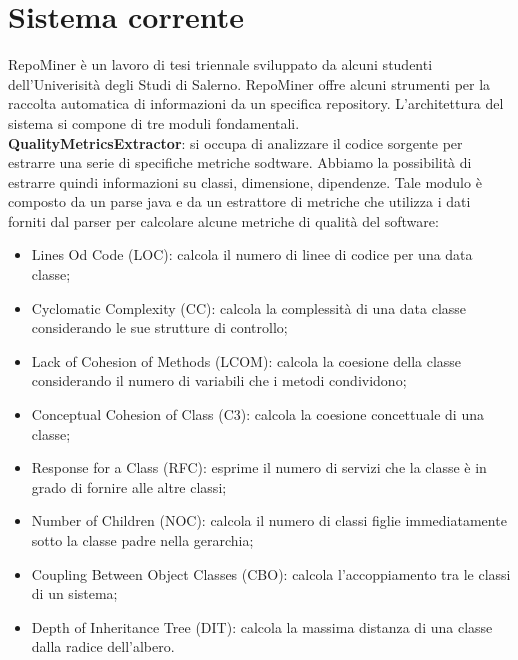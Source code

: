 \section{Sistema corrente}
RepoMiner è un lavoro di tesi triennale sviluppato da alcuni studenti dell'Univerisità degli Studi di Salerno. RepoMiner offre alcuni strumenti per la raccolta automatica di informazioni da un specifica repository. L'architettura del sistema si compone di tre moduli fondamentali. \\

\textbf{QualityMetricsExtractor}: si occupa di analizzare il codice sorgente per estrarre una serie di specifiche metriche sodtware. Abbiamo la possibilità di estrarre quindi informazioni su classi, dimensione, dipendenze. Tale modulo è composto da un parse java e da un estrattore di metriche che utilizza i dati forniti dal parser per calcolare alcune metriche di qualità del software:
\begin{itemize}
\item Lines Od Code (LOC): calcola il numero di linee di codice per una data classe;
\item Cyclomatic Complexity (CC): calcola la complessità di una data classe considerando le sue strutture di controllo;
\item Lack of Cohesion of Methods (LCOM): calcola la coesione della classe considerando il numero di variabili che i metodi condividono;
\item Conceptual Cohesion of Class (C3): calcola la coesione concettuale di una classe;
\item Response for a Class (RFC): esprime il numero di servizi che la classe è in grado di fornire alle altre classi;
\item Number of Children (NOC): calcola il numero di classi figlie immediatamente sotto la classe padre nella gerarchia;
\item Coupling Between Object Classes (CBO): calcola l'accoppiamento tra le classi di un sistema;
\item Depth of Inheritance Tree (DIT): calcola la massima distanza di una classe dalla radice dell'albero.
\end{itemize}

